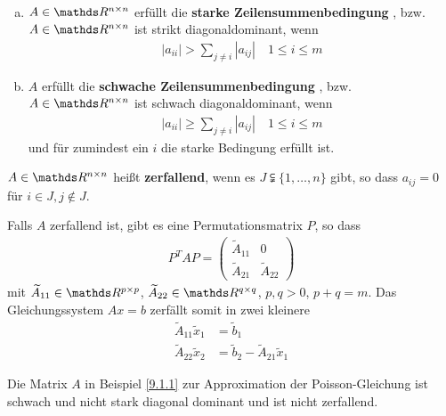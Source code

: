 \begin{Defe}~
  \begin{enumerate}[a)]
  \item $A\in\R^{n\times n}$ erfüllt die \textbf{starke Zeilensummenbedingung}
    , 
    bzw. $A\in\R^{n\times n}$ ist strikt diagonaldominant, wenn
    \begin{gather}
      |a_{ii}|>\sum_{j\neq i} |a_{ij}| \quad 1\leq i\leq m
      \label{IX.3.7}
    \end{gather}
  \item $A$ erfüllt die \textbf{schwache Zeilensummenbedingung}
    , 
    bzw. $A\in\R^{n\times n}$ ist schwach diagonaldominant, wenn
    \begin{gather}
      |a_{ii}|\geq \sum_{j\neq i} |a_{ij}| \quad 1\leq i\leq m
      \label{IX.3.8}
    \end{gather} 
    und für zumindest ein $i$ die starke Bedingung erfüllt ist.
  \end{enumerate}
\end{Defe}

\begin{Defe}
  $A\in\R^{n\times n}$ heißt \textbf{zerfallend},
  wenn es $J\subsetneqq \{1,\dotsc,n\}$ gibt,
  so dass $a_{ij}=0$ für $i\in J, j\not\in J$.
\end{Defe}

\begin{Beme}
  Falls $A$ zerfallend ist, gibt es eine Permutationsmatrix $P$, 
  so dass
  \begin{gather*}
    P^TAP = \begin{pmatrix}
      \widetilde{A}_{11}&0\\
      \widetilde{A}_{21}&\widetilde{A}_{22}
    \end{pmatrix}
  \end{gather*}
  mit $\widetilde{A}_{11}\in\R^{p\times p}$,
  $\widetilde{A}_{22}\in\R^{q\times q}$,
  $p,q>0$, $p+q=m$.
  Das Gleichungssystem $Ax=b$ zerfällt somit in zwei kleinere
  \begin{align*}
    \widetilde{A}_{11}\widetilde{x}_1 &= \widetilde{b}_1\\
    \widetilde{A}_{22}\widetilde{x}_2 &= \widetilde{b}_2
                                        -\widetilde{A}_{21}\widetilde{x}_1
  \end{align*}
\end{Beme}

\begin{Bspe}
  Die Matrix $A$ in Beispiel \ref{9.1.1} zur Approximation der
  Poisson-Gleichung ist schwach und nicht stark diagonal dominant und
  ist nicht zerfallend.
\end{Bspe}

